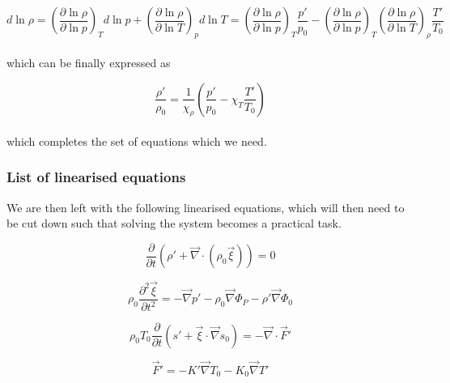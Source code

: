 \documentclass[11pt]{amsart}
\begin{document}
\begin{equation}
d \ln \rho = \left( \frac{\partial \ln \rho}{\partial \ln p} \right)_{T} d \ln p + \left( \frac{\partial \ln \rho}{\partial \ln T} \right)_{p} d \ln T
= \left( \frac{\partial \ln \rho}{\partial \ln p} \right)_{T} \frac{p'}{p_{0}} - \left( \frac{\partial \ln \rho}{\partial \ln p} \right)_{T} \left( \frac{\partial \ln \rho}{\partial \ln T} \right)_{\rho} \frac{T'}{T_{0}}
\end{equation} 
\\
which can be finally expressed as

\begin{equation}
\frac{\rho'}{\rho_{0}}= \frac{1}{\chi_{\rho}} \left( \frac{p'}{p_{0}} - \chi_{T} \frac{T'}{T_{0}} \right)
\end{equation}
\\
which completes the set of equations which we need.






\subsubsection{List of linearised equations}

We are then left with the following linearised equations, which will then need to be cut down such that solving
the system becomes a practical task.


\begin{equation} \label{eq:cont_lin}
\frac{\partial}{\partial t} \left( \rho' + \vec{\nabla} \cdot \left( \rho_{0} \vec{\xi} \right) \right) = 0
\end{equation}


\begin{equation} \label{eq:mom_lin}
\rho_{0} \frac{\partial^{2} \vec{\xi}}{\partial t^{2}} = - \vec{\nabla} p' - \rho_{0} \vec{\nabla} \Phi_{P}
- \rho' \vec{\nabla} \Phi_{0}
\end{equation}

\begin{equation} \label{eq:E_lin}
\rho_{0} T_{0} \frac{\partial}{\partial t} \left( s' + \vec{\xi} \cdot \vec{\nabla} s_{0} \right)
= - \vec{\nabla} \cdot \vec{F}'
\end{equation}


\begin{equation} \label{eq:F_lin}
\vec{F}' = - K' \vec{\nabla} T_{0} - K_{0} \vec{\nabla} T'
\end{equation}
\end{document}

